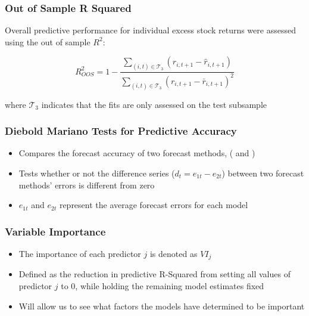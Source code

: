 \documentclass[]{beamer}
\begin{document}
\begin{frame}
\frametitle{Out of Sample R Squared}
Overall predictive performance for individual excess stock returns were assessed using the out of sample $R^2$:

\begin{equation}
R^2_{OOS} = 
	1 - 
	\frac{\sum_{(i, t)\in\mathcal{T}_3}(r_{i, t+1} - \widehat{r}_{i, t+1})}
	{\sum_{(i, t)\in\mathcal{T}_3} \left( r_{i, t+1} - \bar{r}_{i, t+1} \right) ^2}
\end{equation}

where $\mathcal{T}_3$ indicates that the fits are only assessed on the test subsample
\end{frame}

\begin{frame}
\frametitle{Diebold Mariano Tests for Predictive Accuracy}
\begin{itemize}
	\item Compares the forecast accuracy of two forecast methods, (\cite{diebold_comparing_2002} and \cite{harvey_testing_1997})
	
	\item Tests whether or not the difference series ($d_t = e_{1t} - e_{2t}$) between two forecast methods' errors is different from zero
	
	\item $e_{1t}$ and $e_{2t}$ represent the average forecast errors for each model
\end{itemize}
\end{frame}

%
%

\begin{frame}
\frametitle{Variable Importance}

\begin{itemize}
\item The importance of each predictor $j$ is denoted as $VI_j$

\item Defined as the reduction in predictive R-Squared from setting all values of predictor $j$ to 0, while holding the remaining model estimates fixed

\item Will allow us to see what factors the models have determined to be important
\end{itemize}

\end{frame}
\end{document}
